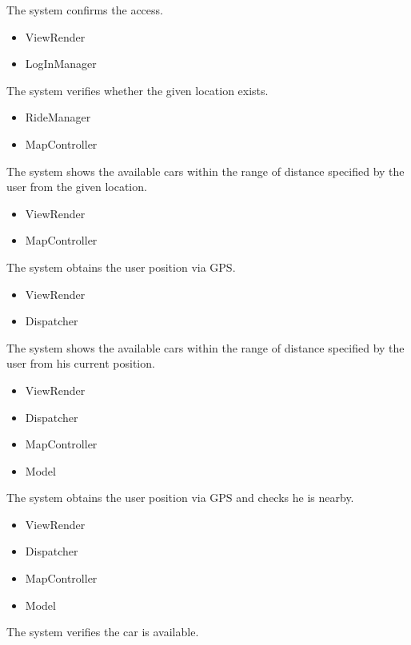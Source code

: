 \documentclass[11pt,a4paper]{report}
\begin{document}
\begin{Req}
\begin{itemize}
			\end{itemize}
		\item The system confirms the access.
			\begin{itemize}
				\item ViewRender
				\item LogInManager
			\end{itemize}
		\item The system verifies whether the given location exists.
			\begin{itemize}
				\item RideManager
				\item MapController
			\end{itemize}
		\item The system shows the available cars within the range of distance specified by the user from the given location.
			\begin{itemize}
				\item ViewRender
				\item MapController
			\end{itemize}
		\item The system obtains the user position via GPS.
			\begin{itemize}
				\item ViewRender
				\item Dispatcher
			\end{itemize}
		\item The system shows the available cars within the range of distance specified by the user from his current position.
			\begin{itemize}
				\item ViewRender
				\item Dispatcher
				\item MapController
				\item Model
			\end{itemize}
		\item The system obtains the user position via GPS and checks he is nearby.
			\begin{itemize}
				\item ViewRender
				\item Dispatcher
				\item MapController
				\item Model
			\end{itemize}
		\item The system verifies the car is available.
			\begin{itemize}

\end{itemize}
\end{Req}
\end{document}
